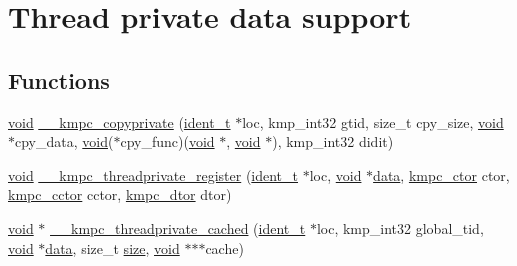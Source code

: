 \hypertarget{group__THREADPRIVATE}{\section{Thread private data support}
\label{group__THREADPRIVATE}
}
\subsection*{Functions}
\begin{DoxyCompactItemize}
\item 
\hyperlink{ittnotify__static_8h_af941d56e55e3c5465135b60c4d6343ed}{void} \hyperlink{group__THREADPRIVATE_ga1453eca6136fd77e5de88ea0e78cc7a4}{\-\_\-\-\_\-kmpc\-\_\-copyprivate} (\hyperlink{group__BASIC__TYPES_ga690fda6b92f039a72db263c6b4394ddb}{ident\-\_\-t} $\ast$loc, kmp\-\_\-int32 gtid, size\-\_\-t cpy\-\_\-size, \hyperlink{ittnotify__static_8h_af941d56e55e3c5465135b60c4d6343ed}{void} $\ast$cpy\-\_\-data, \hyperlink{ittnotify__static_8h_af941d56e55e3c5465135b60c4d6343ed}{void}($\ast$cpy\-\_\-func)(\hyperlink{ittnotify__static_8h_af941d56e55e3c5465135b60c4d6343ed}{void} $\ast$, \hyperlink{ittnotify__static_8h_af941d56e55e3c5465135b60c4d6343ed}{void} $\ast$), kmp\-\_\-int32 didit)
\item 
\hyperlink{ittnotify__static_8h_af941d56e55e3c5465135b60c4d6343ed}{void} \hyperlink{group__THREADPRIVATE_ga120efa08eb51f45664477d30eff31916}{\-\_\-\-\_\-kmpc\-\_\-threadprivate\-\_\-register} (\hyperlink{group__BASIC__TYPES_ga690fda6b92f039a72db263c6b4394ddb}{ident\-\_\-t} $\ast$loc, \hyperlink{ittnotify__static_8h_af941d56e55e3c5465135b60c4d6343ed}{void} $\ast$\hyperlink{ittnotify__static_8h_ae4b7aa9cddc8e1ade7c67ed7e338b18f}{data}, \hyperlink{group__THREADPRIVATE_ga0c2f8074a8474eee42bc96a4bdc7679a}{kmpc\-\_\-ctor} ctor, \hyperlink{group__THREADPRIVATE_gab6148c019e88c8853596bf5f516373b4}{kmpc\-\_\-cctor} cctor, \hyperlink{group__THREADPRIVATE_gad8268ac7d007fa1c3351da682c487c0f}{kmpc\-\_\-dtor} dtor)
\item 
\hyperlink{ittnotify__static_8h_af941d56e55e3c5465135b60c4d6343ed}{void} $\ast$ \hyperlink{group__THREADPRIVATE_gab4aa3dff2b1b55b1abb002ef69c7efe7}{\-\_\-\-\_\-kmpc\-\_\-threadprivate\-\_\-cached} (\hyperlink{group__BASIC__TYPES_ga690fda6b92f039a72db263c6b4394ddb}{ident\-\_\-t} $\ast$loc, kmp\-\_\-int32 global\-\_\-tid, \hyperlink{ittnotify__static_8h_af941d56e55e3c5465135b60c4d6343ed}{void} $\ast$\hyperlink{ittnotify__static_8h_ae4b7aa9cddc8e1ade7c67ed7e338b18f}{data}, size\-\_\-t \hyperlink{ittnotify__static_8h_a5a1daa0c1d342747e3884fa54fc64fb1}{size}, \hyperlink{ittnotify__static_8h_af941d56e55e3c5465135b60c4d6343ed}{void} $\ast$$\ast$$\ast$cache)

\end{DoxyCompactItemize}
